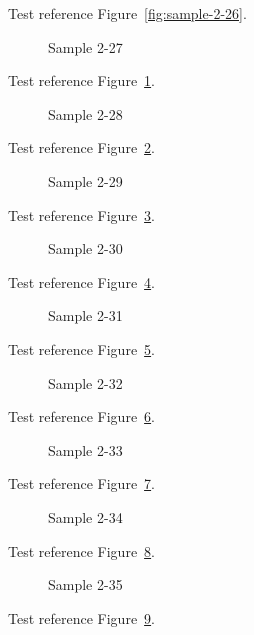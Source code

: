 Test reference Figure~\ref{fig:sample-2-26}.

\begin{figure}[tbhp]
\caption{Sample 2-27}
\label{fig:sample-2-27}
\end{figure}

Test reference Figure~\ref{fig:sample-2-27}.

\begin{figure}[tbhp]
\caption{Sample 2-28}
\label{fig:sample-2-28}
\end{figure}

Test reference Figure~\ref{fig:sample-2-28}.

\begin{figure}[tbhp]
\caption{Sample 2-29}
\label{fig:sample-2-29}
\end{figure}

Test reference Figure~\ref{fig:sample-2-29}.

\begin{figure}[tbhp]
\caption{Sample 2-30}
\label{fig:sample-2-30}
\end{figure}

Test reference Figure~\ref{fig:sample-2-30}.

\begin{figure}[tbhp]
\caption{Sample 2-31}
\label{fig:sample-2-31}
\end{figure}

Test reference Figure~\ref{fig:sample-2-31}.

\begin{figure}[tbhp]
\caption{Sample 2-32}
\label{fig:sample-2-32}
\end{figure}

Test reference Figure~\ref{fig:sample-2-32}.

\begin{figure}[tbhp]
\caption{Sample 2-33}
\label{fig:sample-2-33}
\end{figure}

Test reference Figure~\ref{fig:sample-2-33}.

\begin{figure}[tbhp]
\caption{Sample 2-34}
\label{fig:sample-2-34}
\end{figure}

Test reference Figure~\ref{fig:sample-2-34}.

\begin{figure}[tbhp]
\caption{Sample 2-35}
\label{fig:sample-2-35}
\end{figure}

Test reference Figure~\ref{fig:sample-2-35}.

